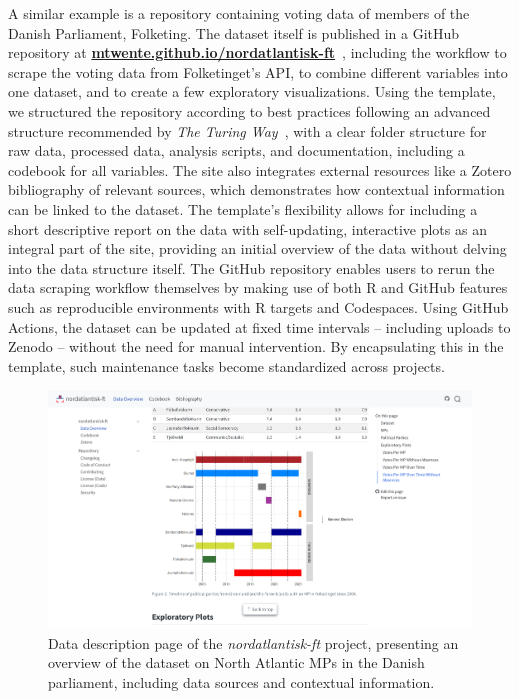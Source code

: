 \documentclass[final]{anthology-ch} %
\begin{document}
A similar example is a repository containing voting data of members of the Danish Parliament, Folketing. The dataset itself is published in a GitHub repository at \href{http://mtwente.github.io/nordatlantisk-ft}{\textbf{mtwente.github.io/nordatlantisk-ft}}~\cite{twente2024a}, including the workflow to scrape the voting data from Folketinget's API, to combine different variables into one dataset, and to create a few exploratory visualizations. Using the template, we structured the repository according to best practices following an advanced structure recommended by \emph{The Turing Way}~\cite{theturingwaycommunity2025}, with a clear folder structure for raw data, processed data, analysis scripts, and documentation, including a codebook for all variables. The site also integrates external resources like a Zotero bibliography of relevant sources, which demonstrates how contextual information can be linked to the dataset. The template's flexibility allows for including a short descriptive report on the data with self-updating, interactive plots as an integral part of the site, providing an initial overview of the data without delving into the data structure itself. The GitHub repository enables users to rerun the data scraping workflow themselves by making use of both R and GitHub features such as reproducible environments with R targets and Codespaces. Using GitHub Actions, the dataset can be updated at fixed time intervals -- including uploads to Zenodo -- without the need for manual intervention. By encapsulating this in the template, such maintenance tasks become standardized across projects.

\begin{figure}[t!]
  \centering
  \includegraphics[width=0.9\linewidth]{images/nordatlantisk_ft_report.png}
  \caption{Data description page of the \emph{nordatlantisk-ft} project, presenting an overview of the dataset on North Atlantic MPs in the Danish parliament, including data sources and contextual information.}
  \label{fig-nordatlantisk}
\end{figure}
\end{document}

